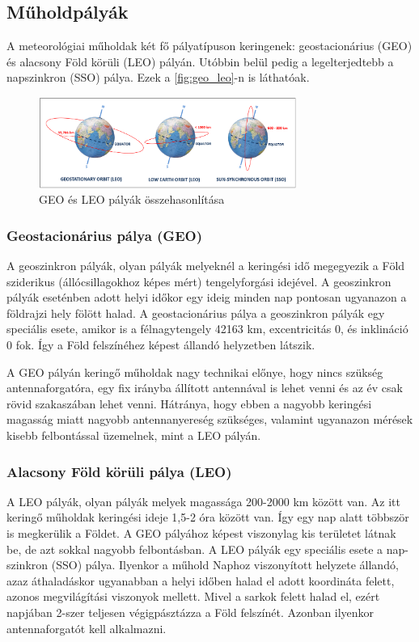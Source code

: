 \documentclass[a4paper,11pt]{article}
\begin{document}
\subsection*{Műholdpályák}

A meteorológiai műholdak két fő pályatípuson keringenek: geostacionárius (GEO) és alacsony Föld körüli (LEO) pályán. Utóbbin belül pedig a legelterjedtebb a napszinkron (SSO)
pálya. Ezek a \autoref{fig:geo_leo}-n is láthatóak.

\begin{figure}[H]
    \centering
    \includegraphics[width=0.75\textwidth]{../resources/orbit-types.png}
    \caption{GEO és LEO pályák összehasonlítása}
    \label{fig:geo_leo}
\end{figure}

\subsubsection*{Geostacionárius pálya (GEO)}
A geoszinkron pályák, olyan pályák melyeknél a keringési idő megegyezik a Föld sziderikus (állócsillagokhoz képes mért) tengelyforgási idejével. A geoszinkron pályák eseténben adott helyi időkor egy ideig minden nap pontosan ugyanazon a földrajzi hely fölött halad.
A geostacionárius pálya a geoszinkron pályák egy speciális esete, amikor is a félnagytengely 42163 km, excentricitás 0, és inklináció 0 fok. Így a Föld felszínéhez képest állandó helyzetben látszik.

A GEO pályán keringő műholdak nagy technikai előnye, hogy nincs szükség antennaforgatóra, egy fix irányba állított antennával is lehet venni és az év csak rövid szakaszában lehet venni.
Hátránya, hogy ebben a nagyobb keringési magasság miatt nagyobb antennanyereség szükséges, valamint ugyanazon mérések kisebb felbontással üzemelnek, mint a LEO pályán.

\subsubsection*{Alacsony Föld körüli pálya (LEO)}

A LEO pályák, olyan pályák melyek magassága 200-2000 km között van. Az itt keringő műholdak keringési ideje 1,5-2 óra között van. Így egy nap alatt többször is megkerülik a Földet. A GEO pályához képest viszonylag kis területet látnak be, de azt sokkal nagyobb felbontásban.
A LEO pályák egy speciális esete a nap-szinkron (SSO) pálya. Ilyenkor a műhold Naphoz viszonyított helyzete állandó, azaz áthaladáskor ugyanabban a helyi időben halad el adott koordináta felett, azonos megvilágítási viszonyok mellett. Mivel a sarkok felett halad el, ezért napjában 2-szer teljesen végigpásztázza a Föld felszínét.
Azonban ilyenkor antennaforgatót kell alkalmazni.
\end{document}
